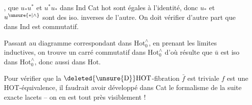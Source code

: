 , que $u_*u^*$ et $u^*u_*$ dans Ind Cat hot sont égales à l'identité, donc $u_*$ et $u^{\unsure{*|\wedge}}$ sont des iso. inverses  de l'autre. On doit vérifier d'autre part  que
dans Ind   est commutatif.

Passant au  diagramme correspondant dans $\mathrm{Hot}_0^{\wedge}$, en prenant les limites inductives, on trouve un carré commutatif dans $\mathrm{Hot}_0^{\wedge}$
d'où résulte que $\bar u$ est iso dans $\mathrm{Hot}_0^{\wedge}$, donc aussi dans Hot.

Pour vérifier que la $\deleted{\unsure{\mathrm D}}\mathrm{HOT}$-fibration $\bar f$ est triviale  $f$ est une  HOT-équivalence, il faudrait avoir développé dans Cat le formalisme de la suite exacte  lacets -- on en est tout près\unsure{,} visiblement !
